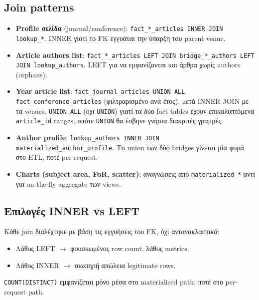 \subsection{Join patterns}

\begin{itemize}\setlength{\itemsep}{0.2em}
    \item \textbf{Profile σελίδα} (journal/conference):
          \texttt{fact\_*\_articles INNER JOIN lookup\_*}. INNER γιατί
          το FK εγγυάται την ύπαρξη του parent venue.
    \item \textbf{Article authors list}:
          \texttt{fact\_*\_articles LEFT JOIN bridge\_*\_authors LEFT JOIN lookup\_authors}.
          LEFT για να εμφανίζονται και άρθρα χωρίς authors (orphans).
    \item \textbf{Year article list}:
          \texttt{fact\_journal\_articles UNION ALL fact\_conference\_articles}
          (φιλτραρισμένο ανά έτος), μετά INNER JOIN με τα venues.
          \texttt{UNION ALL} (όχι \texttt{UNION}) γιατί τα δύο fact
          tables έχουν επικαλυπτόμενα \texttt{article\_id} ranges,
          οπότε \texttt{UNION} θα έσβηνε γνήσια διακριτές γραμμές.
    \item \textbf{Author profile}:
          \texttt{lookup\_authors INNER JOIN materialized\_author\_profile}.
          Το union των δύο bridges γίνεται μία φορά στο ETL, ποτέ
          per request.
    \item \textbf{Charts (subject area, FoR, scatter)}: αναγνώσεις
          από \texttt{materialized\_*} αντί για on-the-fly aggregate
          των views.
\end{itemize}

\subsection{Επιλογές INNER vs LEFT}

Κάθε join διαλέχτηκε με βάση τις εγγυήσεις του FK, όχι αντανακλαστικά:

\begin{itemize}\setlength{\itemsep}{0.2em}
    \item Λάθος LEFT $\rightarrow$ φουσκωμένος row count, λάθος metrics.
    \item Λάθος INNER $\rightarrow$ σιωπηρή απώλεια legitimate rows.
\end{itemize}

\texttt{COUNT(DISTINCT)} εμφανίζεται μόνο μέσα στο materialised path,
ποτέ στο per-request path.

